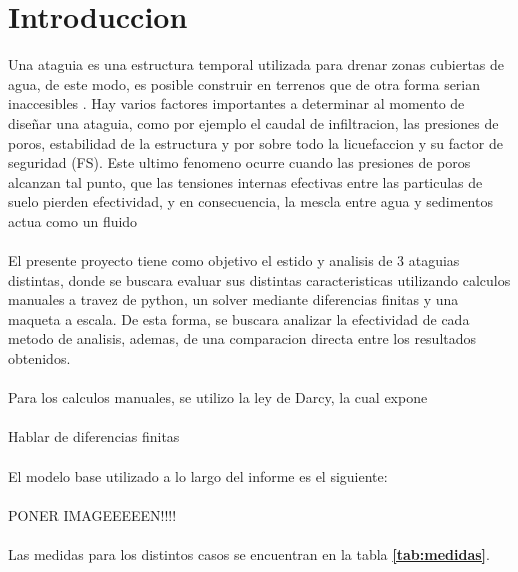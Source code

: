 \section*{Introduccion}

Una ataguia es una estructura temporal utilizada para drenar zonas cubiertas de agua, de este modo, es posible construir en terrenos
que de otra forma serian inaccesibles \textbf{\cite{madanayaka2018}}. Hay varios factores importantes a determinar al momento de diseñar
una ataguia, como por ejemplo el caudal de infiltracion, las presiones de poros, estabilidad de la estructura y por sobre todo la licuefaccion
y su factor de seguridad (FS). Este ultimo fenomeno ocurre cuando las presiones de poros alcanzan tal punto, que las tensiones internas efectivas
entre las particulas de suelo pierden efectividad, y en consecuencia, la mescla entre agua y sedimentos actua como un fluido \textbf{\cite{sumer2009}}
\\ \\
El presente proyecto tiene como objetivo el estido y analisis de 3 ataguias distintas, donde se buscara evaluar sus distintas caracteristicas utilizando 
calculos manuales a travez de python, un solver mediante diferencias finitas y una maqueta a escala. De esta forma, se buscara analizar la efectividad
de cada metodo de analisis, ademas, de una comparacion directa entre los resultados obtenidos.
\\ \\
Para los calculos manuales, se utilizo la ley de Darcy, la cual expone 
\\ \\
Hablar de diferencias finitas
\\ \\
El modelo base utilizado a lo largo del informe es el siguiente:
\\ \\
PONER IMAGEEEEEN!!!!
\\ \\
Las medidas para los distintos casos se encuentran en la tabla \textbf{\ref{tab:medidas}}.

